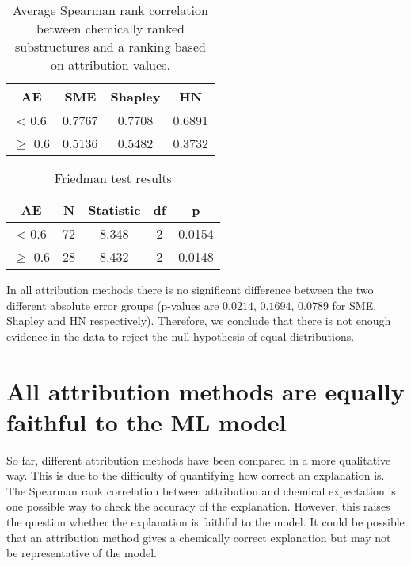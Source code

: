 \begin{table}[h]
    \centering
    \caption{Average Spearman rank correlation between chemically ranked substructures and 
    a ranking based on attribution values.}
    \begin{tabular}{cccc}
    \toprule
    AE & SME & Shapley & HN \\
    \midrule
     < 0.6 & 0.7767 & 0.7708 & 0.6891 \\
    $\ge$ 0.6 & 0.5136 & 0.5482 & 0.3732 \\
     \bottomrule
    \end{tabular}
\end{table}


\begin{table}[h]
    \centering
    \caption{Friedman test results}
    \label{fig:friedman_results}
    \begin{tabular}{ccccc}
    \toprule
    AE & N & Statistic & df & p \\
    \midrule
     < 0.6 & 72 & 8.348 & 2 & 0.0154  \\
    $\ge$ 0.6 & 28 & 8.432 & 2 & 0.0148 \\
     \bottomrule
    \end{tabular}
\end{table}



In all attribution methods there is no significant difference between the two different
absolute error groups (p-values are $0.0214$, $0.1694$, $0.0789$ for SME, Shapley and
HN respectively). Therefore, we conclude that there is not enough evidence in the
data to reject the null hypothesis of equal distributions. 



\section{All attribution methods are equally faithful to the ML model}


So far, different attribution methods have been compared in a more qualitative way. 
This is due to the difficulty of quantifying how correct an explanation is. The 
Spearman rank correlation between attribution and chemical expectation is one 
possible way to check the accuracy of the explanation. However, this raises the 
question whether the explanation is faithful to the model. It could be possible 
that an attribution method gives a chemically correct explanation but may not be 
representative of the model. 


